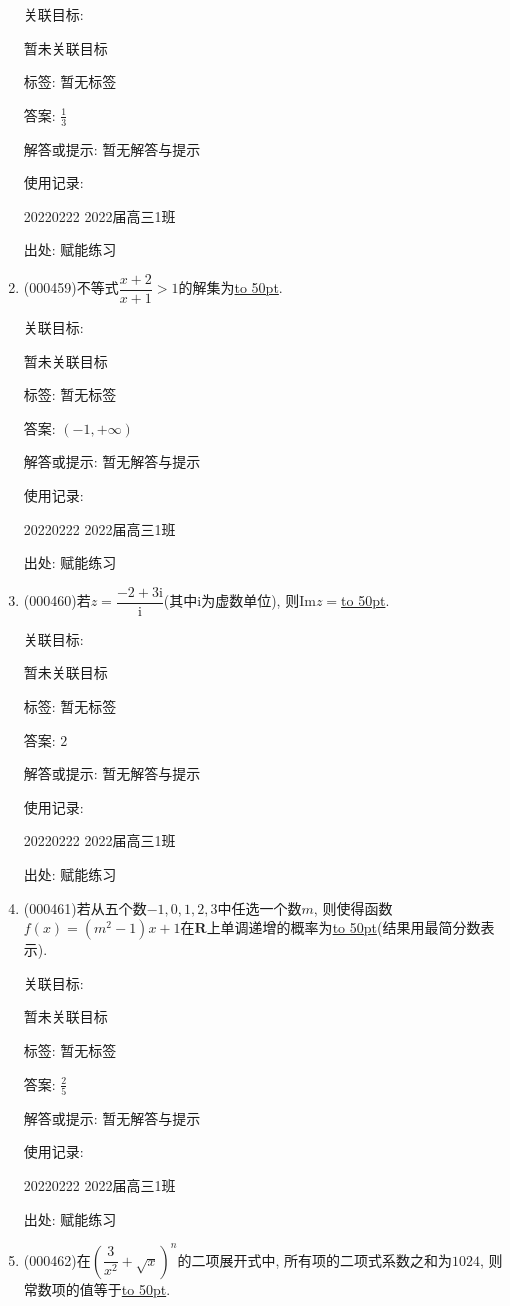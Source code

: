 \documentclass[10pt,a4paper]{article}
\newcommand{\blank}[1]{\underline{\hbox to #1pt{}}}
\begin{document}
\begin{enumerate}[1.]
关联目标:

暂未关联目标



标签: 暂无标签

答案: $\frac 13$

解答或提示: 暂无解答与提示

使用记录:

20220222	2022届高三1班	


出处: 赋能练习
\item { (000459)}不等式$\dfrac{x+2}{x+1}>1$的解集为\blank{50}.


关联目标:

暂未关联目标



标签: 暂无标签

答案: $(-1,+\infty)$

解答或提示: 暂无解答与提示

使用记录:

20220222	2022届高三1班	


出处: 赋能练习
\item { (000460)}若$z=\dfrac{-2+3\mathrm{i}}{\mathrm{i}}$(其中$\mathrm{i}$为虚数单位), 则$\mathrm{Im} z=$\blank{50}.


关联目标:

暂未关联目标



标签: 暂无标签

答案: $2$

解答或提示: 暂无解答与提示

使用记录:

20220222	2022届高三1班	


出处: 赋能练习
\item { (000461)}若从五个数$-1,0,1,2,3$中任选一个数$m$, 则使得函数$f(x)=(m^2-1)x+1$在$\mathbf{R}$上单调递增的概率为\blank{50}(结果用最简分数表示).


关联目标:

暂未关联目标



标签: 暂无标签

答案: $\frac 25$

解答或提示: 暂无解答与提示

使用记录:

20220222	2022届高三1班	


出处: 赋能练习
\item { (000462)}在$(\dfrac3{x^2}+\sqrt{x})^n$的二项展开式中, 所有项的二项式系数之和为$1024$, 则常数项的值等于\blank{50}.



\end{enumerate}
\end{document}

